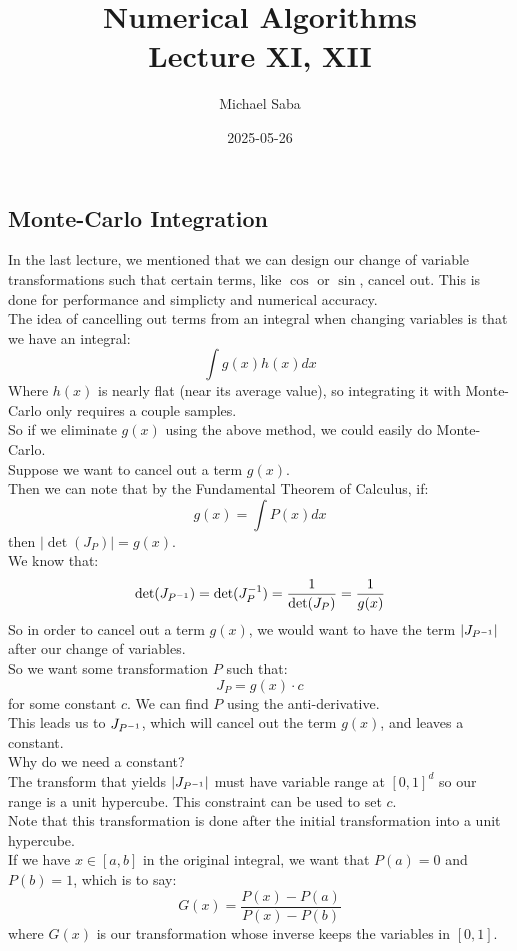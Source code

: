 \documentclass[12pt]{article}
\title{%
    \Huge Numerical Algorithms \\
    \Large Lecture XI, XII
}
\date{2025-05-26}
\author{Michael Saba}
\begin{document}
\maketitle
\newpage
\setlength{\parindent}{0pt}

\subsection*{Monte-Carlo Integration}

In the last lecture, we mentioned that
we can design our change of variable transformations
such that certain terms, like $\cos$
or $\sin$, cancel out.
This is done for performance and simplicty
and numerical accuracy. \\

The idea of cancelling out terms from
an integral when changing variables
is that we have an integral:
\[ \int g(x)h(x) dx \]
Where $h(x)$ is nearly flat (near its average
value), so integrating it with Monte-Carlo
only requires a couple samples. \\
So if we eliminate $g(x)$ using the above method,
we could easily do Monte-Carlo. \\

Suppose we want to cancel out a term 
$g(x)$. \\
Then we can note that by the Fundamental
Theorem of Calculus, if:
\[ g(x) = \int P(x) dx \]
then $|\det(J_P)| = g(x)$. \\
We know that:
\[ \det(J_{P^{-1}}) =  \det(J_{P}^{-1})
= \dfrac{1}{\det(J_{P})}
= \dfrac{1}{g(x)} \]
So in order to cancel out a term $g(x)$,
we would want to have the term
$|J_{P^{-1}}|$ after our change of variables. \\

So we want some transformation $P$ such that:
\[ J_{P} = g(x) \cdot c \]
for some constant $c$. 
We can find $P$ using the anti-derivative. \\
This leads us to $J_{P^{-1}}$, which
will cancel out the term $g(x)$,
and leaves a constant. \\

Why do we need a constant? \\
The transform that yields $|J_{P^{-1}}|$
must have variable range at $[0, 1]^d$
so our range is a unit hypercube.
This constraint can be used to set $c$. \\
Note that this transformation is done 
after the initial transformation into a 
unit hypercube. \\
If we have $x \in [a, b]$ in the original
integral, we want that $P(a) = 0$
and $P(b) = 1$,
which is to say:
\[ G(x) = \dfrac{P(x) - P(a)}{P(x) - P(b)} \]
where $G(x)$ is our transformation
whose inverse keeps the variables 
in $[0, 1]$. \\
\end{document}
